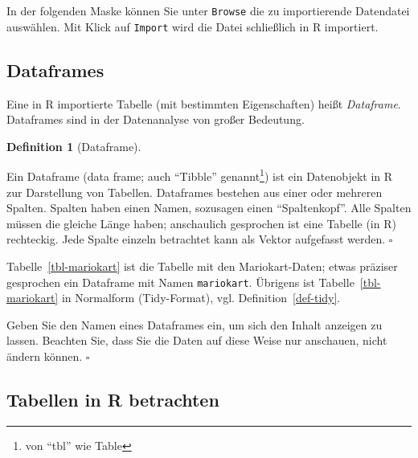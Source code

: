 \documentclass[
  a4paper,
  DIV=11]{scrreprt}
\theoremstyle{definition}
\theoremstyle{definition}
\theoremstyle{definition}
\newtheorem{definition}{Definition}[chapter]
\theoremstyle{remark}
\begin{document}
In der folgenden Maske können Sie unter \texttt{Browse} die zu
importierende Datendatei auswählen. Mit Klick auf \texttt{Import} wird
die Datei schließlich in R importiert.

\subsection{Dataframes}\label{dataframes}

Eine in R importierte Tabelle (mit bestimmten Eigenschaften) heißt
\emph{Dataframe}. Dataframes sind in der Datenanalyse von großer
Bedeutung.

\begin{definition}[Dataframe]\protect\hypertarget{def-dataframe}{}\label{def-dataframe}

Ein Dataframe (data frame; auch ``Tibble'' genannt\footnote{von ``tbl''
  wie Table}) ist ein Datenobjekt in R zur Darstellung von Tabellen.
Dataframes bestehen aus einer oder mehreren Spalten. Spalten haben einen
Namen, sozusagen einen ``Spaltenkopf''. Alle Spalten müssen die gleiche
Länge haben; anschaulich gesprochen ist eine Tabelle (in R) rechteckig.
Jede Spalte einzeln betrachtet kann als Vektor aufgefasst werden.
\(\square\)

\end{definition}

Tabelle~\ref{tbl-mariokart} ist die Tabelle mit den Mariokart-Daten;
etwas präziser gesprochen ein Dataframe mit Namen \texttt{mariokart}.
Übrigens ist Tabelle~\ref{tbl-mariokart} in Normalform (Tidy-Format),
vgl. Definition~\ref{def-tidy}.

\begin{tcolorbox}[enhanced jigsaw, leftrule=.75mm, opacitybacktitle=0.6, colback=white, colframe=quarto-callout-note-color-frame, coltitle=black, colbacktitle=quarto-callout-note-color!10!white, opacityback=0, left=2mm, breakable, titlerule=0mm, toptitle=1mm, bottomtitle=1mm, rightrule=.15mm, title=\textcolor{quarto-callout-note-color}{\faInfo}\hspace{0.5em}{Hinweis}, arc=.35mm, bottomrule=.15mm, toprule=.15mm]

Geben Sie den Namen eines Dataframes ein, um sich den Inhalt anzeigen zu
lassen. Beachten Sie, dass Sie die Daten auf diese Weise nur anschauen,
nicht ändern können. \(\square\)

\end{tcolorbox}

\subsection{Tabellen in R betrachten}\label{sec-viewtab}
\end{document}
